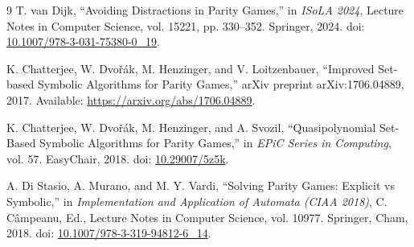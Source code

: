 \documentclass[11pt, a4paper]{article}
\begin{document}
\begin{thebibliography}{9}
T. van Dijk,
``Avoiding Distractions in Parity Games,''
in \textit{ISoLA 2024},
Lecture Notes in Computer Science, vol. 15221,
pp. 330--352.
Springer, 2024.
doi: \href{https://doi.org/10.1007/978-3-031-75380-0_19}
{10.1007/978-3-031-75380-0\_19}.

K. Chatterjee, W. Dvo\v{r}\'ak, M. Henzinger, and V. Loitzenbauer,
``Improved Set-based Symbolic Algorithms for Parity Games,''
arXiv preprint arXiv:1706.04889, 2017.
Available: \url{https://arxiv.org/abs/1706.04889}.

K. Chatterjee, W. Dvo\v{r}\'ak, M. Henzinger, and A. Svozil,
``Quasipolynomial Set-Based Symbolic Algorithms for Parity Games,''
in \textit{EPiC Series in Computing},
vol. 57.
EasyChair, 2018.
doi: \href{https://doi.org/10.29007/5z5k}
{10.29007/5z5k}.

A. Di Stasio, A. Murano, and M. Y. Vardi,
``Solving Parity Games: Explicit vs Symbolic,''
in \textit{Implementation and Application of Automata (CIAA 2018)},
C. C\^{a}mpeanu, Ed.,
Lecture Notes in Computer Science, vol. 10977.
Springer, Cham, 2018.
doi: \href{https://doi.org/10.1007/978-3-319-94812-6_14}
{10.1007/978-3-319-94812-6\_14}.
\end{thebibliography}
\end{document}

